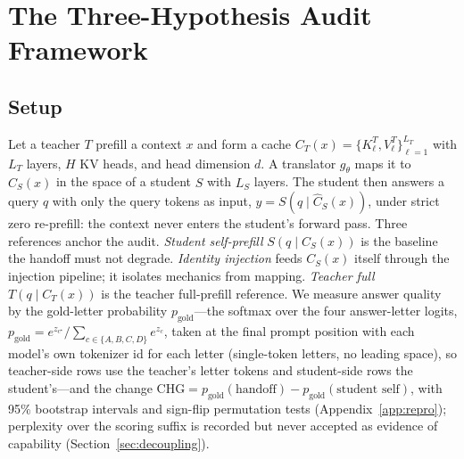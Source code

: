 \documentclass{article} %
\newcommand{\chg}{\mathrm{CHG}}
\newcommand{\gold}{p_{\mathrm{gold}}}
\begin{document}
\section{The Three-Hypothesis Audit Framework}
\label{sec:framework}

\subsection{Setup}
Let a teacher $T$ prefill a context $x$ and form a cache
$C_T(x) = \{K^T_\ell, V^T_\ell\}_{\ell=1}^{L_T}$ with $L_T$ layers, $H$ KV
heads, and head dimension $d$. A translator $g_\theta$ maps it to
$\widehat{C}_S(x)$ in the space of a student $S$ with $L_S$ layers. The
student then answers a query $q$ with only the query tokens as input,
$\hat{y} = S(q \mid \widehat{C}_S(x))$, under strict zero re-prefill: the
context never enters the student's forward pass. Three references anchor the
audit. \emph{Student self-prefill} $S(q \mid C_S(x))$ is the baseline the
handoff must not degrade. \emph{Identity injection} feeds $C_S(x)$ itself
through the injection pipeline; it isolates mechanics from mapping.
\emph{Teacher full} $T(q \mid C_T(x))$ is the teacher full-prefill reference. We
measure answer quality by the gold-letter probability $\gold$---the softmax over
the four answer-letter logits,
$\gold = e^{z_{c^\star}}/\sum_{c \in \{A,B,C,D\}} e^{z_c}$, taken at the final
prompt position with each model's own tokenizer id for each letter (single-token
letters, no leading space), so teacher-side rows use the teacher's letter tokens
and student-side rows the student's---and the change
$\chg = \gold(\text{handoff}) - \gold(\text{student self})$, with
95\% bootstrap intervals and sign-flip permutation tests (Appendix~\ref{app:repro}); perplexity over the
scoring suffix is recorded but never accepted as evidence of capability
(Section~\ref{sec:decoupling}).
\end{document}
